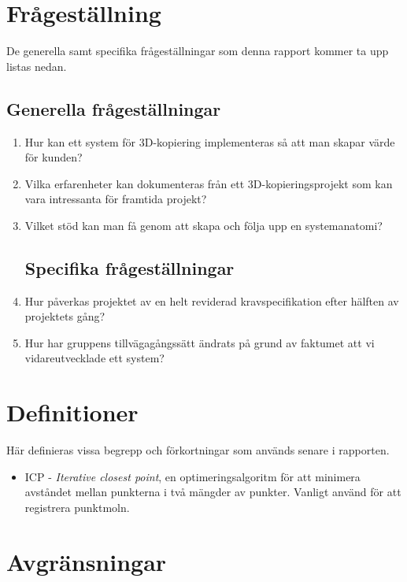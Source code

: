 \section{Frågeställning}
De generella samt specifika frågeställningar som denna rapport kommer ta upp listas nedan.

\subsection{Generella frågeställningar}
\label{sec:research-questions-general}

\begin{enumerate}
	\item Hur kan ett system för 3D-kopiering implementeras så att man skapar värde för kunden?
	\item Vilka erfarenheter kan dokumenteras från ett 3D-kopieringsprojekt som kan vara intressanta för framtida projekt?
	\item Vilket stöd kan man få genom att skapa och följa upp en systemanatomi?
	
\subsection{Specifika frågeställningar}
\label{sec:research-questions-specific}
	
	\item Hur påverkas projektet av en helt reviderad kravspecifikation efter hälften av projektets gång?
	\item Hur har gruppens tillvägagångssätt ändrats på grund av faktumet att vi vidareutvecklade ett system? 
	
\end{enumerate}

\section{Definitioner}
\label{sec:definitions}
Här definieras vissa begrepp och förkortningar som används senare i rapporten.

\begin{itemize}
\item ICP - \textit{Iterative closest point}, en optimeringsalgoritm för att minimera avståndet mellan punkterna i två mängder av punkter. Vanligt använd för att registrera punktmoln. 
\end{itemize} 

\section{Avgränsningar}
\label{sec:delimitations}

